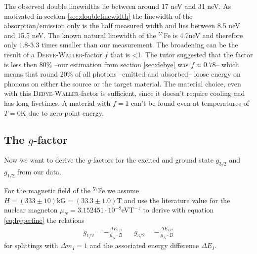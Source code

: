 \documentclass[11pt,a4paper,notitlepage]{scrartcl}
\begin{document}
The observed double linewidths lie between around  17 neV and 31 neV. As motivated in section \ref{sec:doublelinewidth} the linewidth of the absorption/emission only is the half measured width and lies between 8.5 neV and 15.5 neV. The known natural linewidth of the $^{57}$Fe is 4.7neV \cite{schatz} and therefore only 1.8-3.3 times smaller than our measurement. The broadening can be the result of a \textsc{Debye-Waller}-factor $f$ that is <1. The tutor suggested that the factor is less then $80\%$ --our estimation from section \ref{sec:debye} was $f\approx0.78$-- which means that round 20\% of all photons --emitted and absorbed-- loose energy on phonons on either the source or the target material. The material choice, even with this \textsc{Debye-Waller}-factor is sufficient, since it doesn't require cooling and has long livetimes. A material with $f=1$ can't be found even at temperatures of $T=0$K due to zero-point energy. \cite{schatz}
\subsection{The $g$-factor}
Now we want to derive the $g$-factors for the excited and ground state $g_{3/2}$ and  $g_{1/2}$ from our data. 

For the magnetic field of the $^{57}$Fe we assume $H=(333 \pm10)\text{kG}=(33.3\pm 1.0)$T \cite{manual} and use the literature value for the nuclear magneton $\mu_N=3.152451\cdot 10^{-8}$eVT$^{-1}$ \cite{magneton} to derive with equation \eqref{eq:hyperfine} the relations
\begin{align*}
	g_{1/2}=-\frac{\Delta E_{1/2}}{\mu_N\cdot B} && g_{3/2}=-\frac{\Delta E_{3/2}}{\mu_N\cdot B}
\end{align*}
for splittings with $\Delta m_I=1$ and the associated energy difference $\Delta E_I$. 
\end{document}
